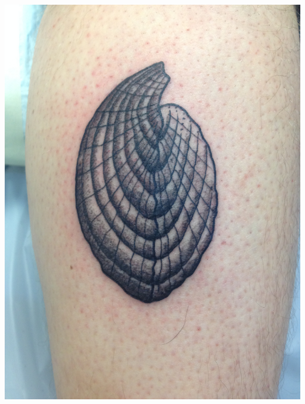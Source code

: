 \documentclass{beamer}
\begin{document}
\begin{frame}
\begin{columns}
\begin{column}{0.5\textwidth}
\begin{center}
        \includegraphics[height = 0.555\textheight, keepaspectratio = true]{figure/tattoo}
      \end{center}
    \end{column}
  \end{columns}
\end{frame}
\end{document}
